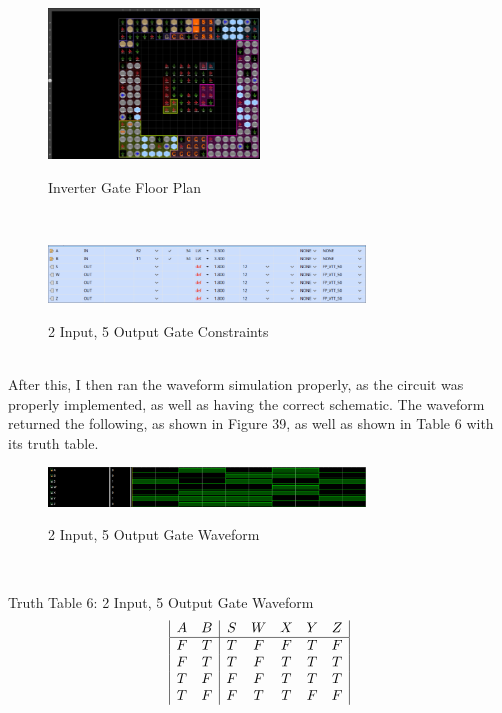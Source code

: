 \documentclass{article}
\begin{document}
\begin{figure}[!!htbpbp]
    \centering
    \caption{Inverter Gate Floor Plan}
    \includegraphics[width=0.5\textwidth]{2input-GATE-FLOOR-PLAN.png}
    \label{2 Input 5 Output, Floor Plan}
\end{figure}\\
\begin{figure}[!!htbpbp]
    \centering
    \caption{2 Input, 5 Output Gate Constraints}
    \includegraphics[width=0.75\textwidth]{2input-GATE-CONSTRAINTS.png}
    \label{2 Input 5 Output Gate, Constrants}
\end{figure}\\
After this, I then ran the waveform simulation properly, as the circuit was properly implemented, as well as having the correct schematic. The waveform returned the following, as shown in Figure 39, as well as shown in Table 6 with its truth table.\\
\begin{figure}[!!htbpbp]
    \centering
    \caption{2 Input, 5 Output Gate Waveform}
    \includegraphics[width=0.75\textwidth]{2input-GATE-WAVEFORM.png}
    \label{2 Input 5 Output Gate, Waveform}
\end{figure}\\
\begin{center}
    Truth Table 6: 2 Input, 5 Output Gate Waveform
    \begin{displaymath}
    \begin{array}{|c c|c c c c c|}
    A & B & S & W & X & Y & Z\\
    \hline
    F & T & T & F & F & T & F\\
    F & T & T & F & T & T & T\\
    T & F & F & F & T & T & T\\
    T & F & F & T & T & F & F\\
    \end{array}
    \end{displaymath}
\end{center}
\end{document}
